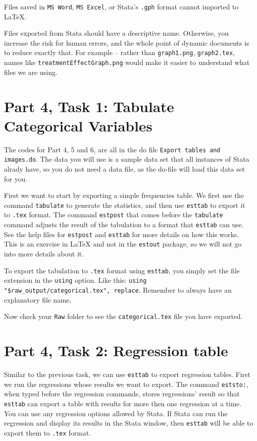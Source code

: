 \documentclass[]{article}
\begin{document}
Files saved in \texttt{MS Word}, \texttt{MS Excel}, or Stata's \texttt{.gph} format cannot imported to {\LaTeX}.

Files exported from Stata should have a descriptive name. Otherwise, you increase the risk for human errors, and the whole point of dynamic documents is to reduce exactly that. For example -- rather than \texttt{graph1.png}, \texttt{graph2.tex}, names like \texttt{treatmentEffectGraph.png} would make it easier to understand what files we are using.

\section*{Part 4, Task 1: Tabulate Categorical Variables}

The codes for Part 4, 5 and 6, are all in the do file \texttt{Export tables and images.do}. The data you will use is a sample data set that all instances of Stata alrady have, so you do not need a data file, as the do-file will load this data set for you.

First we want to start by exporting a simple frequencies table. We first use the command \texttt{tabulate} to generate the statistics, and then use \texttt{esttab} to export it to \texttt{.tex} format. The command \texttt{estpost} that comes before the \texttt{tabulate} command adjusts the result of the tabulation to a format that \texttt{esttab} can use. See the help files for \texttt{estpost} and \texttt{esttab} for more details on how this works. This is an exercise in {\LaTeX} and not in the \texttt{estout} package, so we will not go into more details about it. 

To export the tabulation to \texttt{.tex} format using \texttt{esttab}, you simply set the file extension in the \texttt{using} option. Like this: \verb|using "$raw_output/categorical.tex", replace|. Remember to always have an explanatory file name.

Now check your \texttt{Raw} folder to see the \texttt{categorical.tex} file you have exported.

\section*{Part 4, Task 2: Regression table}

Similar to the previous task, we can use \texttt{esttab} to export regression tables. First we run the regressions whose results we want to export. The command \texttt{eststo:}, when typed before the regression commands, stores regressions' result so that \texttt{esttab} can export a table with results for more then one regression at a time. You can use any regression options allowed by Stata. If Stata can run the regression and display its results in the Stata window, then \texttt{esttab} will be able to export them to \texttt{.tex} format.
\end{document}
